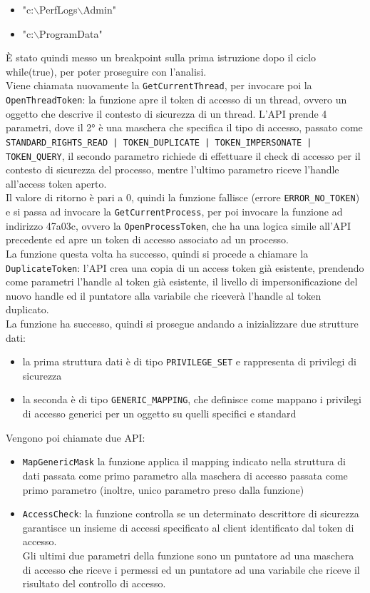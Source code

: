 \documentclass[12pt]{extarticle}
\begin{document}
\begin{itemize}
        \item "c:$\backslash$PerfLogs$\backslash$Admin"
        \item "c:$\backslash$ProgramData"
\end{itemize}
È stato quindi messo un breakpoint sulla prima istruzione dopo il ciclo while(true), per poter proseguire con l'analisi.\\Viene chiamata nuovamente la \texttt{GetCurrentThread}, per invocare poi la \texttt{OpenThreadToken}: la funzione apre il token di accesso di un thread, ovvero un oggetto che descrive il contesto di sicurezza di un thread. L'API prende 4 parametri, dove il 2° è una maschera che specifica il tipo di accesso, passato come \texttt{STANDARD\_RIGHTS\_READ | TOKEN\_DUPLICATE | TOKEN\_IMPERSONATE | TOKEN\_QUERY}, il secondo parametro richiede di effettuare il check di accesso per il contesto di sicurezza del processo, mentre l'ultimo parametro riceve l'handle all'access token aperto.\\Il valore di ritorno è pari a 0, quindi la funzione fallisce (errore \texttt{ERROR\_NO\_TOKEN}) e si passa ad invocare la \texttt{GetCurrentProcess}, per poi invocare la funzione ad indirizzo 47a03c, ovvero la \texttt{OpenProcessToken}, che ha una logica simile all'API precedente ed apre un token di accesso associato ad un processo.\\La funzione questa volta ha successo, quindi si procede a chiamare la \texttt{DuplicateToken}: l'API crea una copia di un access token già esistente, prendendo come parametri l'handle al token già esistente, il livello di impersonificazione del nuovo handle ed il puntatore alla variabile che riceverà l'handle al token duplicato.\\La funzione ha successo, quindi si prosegue andando a inizializzare due strutture dati:
\begin{itemize}
    \item la prima struttura dati è di tipo \texttt{PRIVILEGE\_SET} e rappresenta di privilegi di sicurezza
    \item la seconda è di tipo \texttt{GENERIC\_MAPPING}, che definisce come mappano i privilegi di accesso generici per un oggetto su quelli specifici e standard 
\end{itemize}
Vengono poi chiamate due API:
\begin{itemize}
    \item \texttt{MapGenericMask} la funzione applica il mapping indicato nella struttura di dati passata come primo parametro alla maschera di accesso passata come primo parametro (inoltre, unico parametro preso dalla funzione)
    \item \texttt{AccessCheck}: la funzione controlla se un determinato descrittore di sicurezza garantisce un insieme di accessi specificato al client identificato dal token di accesso.\\Gli ultimi due parametri della funzione sono un puntatore ad una maschera di accesso che riceve i permessi ed un puntatore ad una variabile che riceve il risultato del controllo di accesso. 
\end{itemize}
\end{document}
